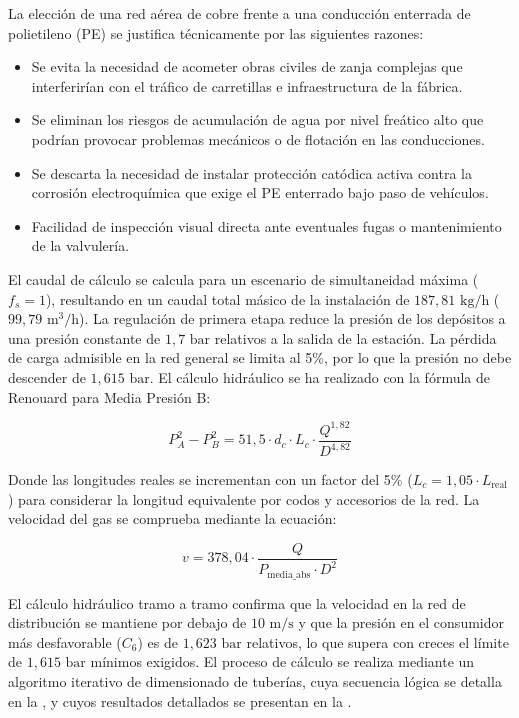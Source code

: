 \documentclass[12pt]{article}
\begin{document}
        La elección de una red aérea de cobre frente a una conducción enterrada de polietileno (PE) se justifica técnicamente por las siguientes razones:
        \begin{itemize}
            \item Se evita la necesidad de acometer obras civiles de zanja complejas que interferirían con el tráfico de carretillas e infraestructura de la fábrica.
            \item Se eliminan los riesgos de acumulación de agua por nivel freático alto que podrían provocar problemas mecánicos o de flotación en las conducciones.
            \item Se descarta la necesidad de instalar protección catódica activa contra la corrosión electroquímica que exige el PE enterrado bajo paso de vehículos.
            \item Facilidad de inspección visual directa ante eventuales fugas o mantenimiento de la valvulería.
        \end{itemize}
        
        El caudal de cálculo se calcula para un escenario de simultaneidad máxima ($f_s=1$), resultando en un caudal total másico de la instalación de $187,81\text{ kg/h}$ ($99,79\text{ m}^3\text{/h}$). La regulación de primera etapa reduce la presión de los depósitos a una presión constante de $1,7\text{ bar}$ relativos a la salida de la estación. La pérdida de carga admisible en la red general se limita al 5\%, por lo que la presión no debe descender de $1,615\text{ bar}$. El cálculo hidráulico se ha realizado con la fórmula de Renouard para Media Presión B:
        
        \begin{equation}
            P_A^2 - P_B^2 = 51,5 \cdot d_c \cdot L_c \cdot \frac{Q^{1,82}}{D^{4,82}}
        \end{equation}
        
        Donde las longitudes reales se incrementan con un factor del 5\% ($L_c = 1,05 \cdot L_{\text{real}}$) para considerar la longitud equivalente por codos y accesorios de la red. La velocidad del gas se comprueba mediante la ecuación:
        
        \begin{equation}
            v = 378,04 \cdot \frac{Q}{P_{\text{media\_abs}} \cdot D^2}
        \end{equation}
        
        El cálculo hidráulico tramo a tramo confirma que la velocidad en la red de distribución se mantiene por debajo de $10\text{ m/s}$ y que la presión en el consumidor más desfavorable ($C_6$) es de $1,623\text{ bar}$ relativos, lo que supera con creces el límite de $1,615\text{ bar}$ mínimos exigidos. El proceso de cálculo se realiza mediante un algoritmo iterativo de dimensionado de tuberías, cuya secuencia lógica se detalla en la , y cuyos resultados detallados se presentan en la .
\end{document}
